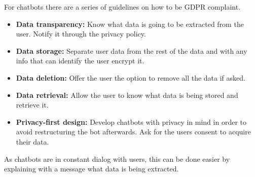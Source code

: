 For chatbots there are a series of guidelines on how to be GDPR complaint.

\begin{itemize}
	\item \textbf{Data transparency:} Know what data is going to be extracted from the user. Notify it through the privacy policy.
	\item \textbf{Data storage:} Separate user data from the rest of the data and with any info that can identify the user encrypt it.
	\item \textbf{Data deletion:} Offer the user the option to remove all the data if asked.
	\item \textbf{Data retrieval:} Allow the user to know what data is being stored and retrieve it.
	\item \textbf{Privacy-first design:} Develop chatbots with privacy in mind in order to avoid restructuring the bot afterwards.  Ask for the users consent to acquire their data.
\end{itemize}

As chatbots are in constant dialog with users, this can be done easier by explaining with a message what data is being extracted.\cite{reg-fr-gdpr}


